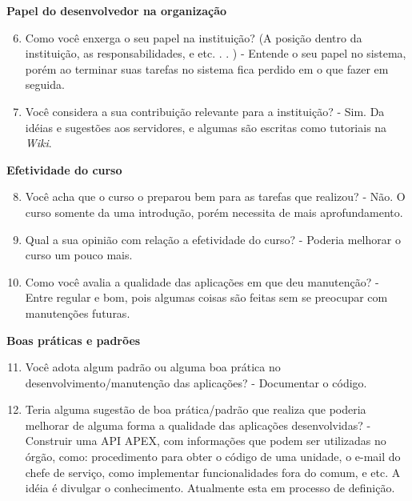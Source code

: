 \begin{apendicesenv}
\textbf{Papel do desenvolvedor na organização}

\begin{enumerate}
	\setcounter{enumi}{5}
	\item Como você enxerga o seu papel na instituição? (A posição dentro da instituição, as
	responsabilidades, e etc. . . )\newline
	- Entende o seu papel no sistema, porém ao terminar suas tarefas no sistema fica perdido em o que fazer em seguida.
	\item Você considera a sua contribuição relevante para a instituição?\newline
	- Sim. Da idéias e sugestões aos servidores, e algumas são escritas como tutoriais na \textit{Wiki}.
\end{enumerate}

\textbf{Efetividade do curso}

\begin{enumerate}
	\setcounter{enumi}{7}
	\item Você acha que o curso o preparou bem para as tarefas que realizou?\newline
	- Não. O curso somente da uma introdução, porém necessita de mais aprofundamento.
	\item Qual a sua opinião com relação a efetividade do curso?\newline
	- Poderia melhorar o curso um pouco mais.
	\item Como você avalia a qualidade das aplicações em que deu manutenção?\newline
	- Entre regular e bom, pois algumas coisas são feitas sem se preocupar com manutenções futuras.
\end{enumerate}

\textbf{Boas práticas e padrões}

\begin{enumerate}
	\setcounter{enumi}{10}
	\item Você adota algum padrão ou alguma boa prática no desenvolvimento/manutenção das
	aplicações?\newline
	- Documentar o código.
	\item Teria alguma sugestão de boa prática/padrão que realiza que poderia melhorar de
	alguma forma a qualidade das aplicações desenvolvidas?\newline
	- Construir uma API APEX, com informações que podem ser utilizadas no órgão, como: procedimento para obter o código de uma unidade, o e-mail do chefe de serviço, como implementar funcionalidades fora do comum, e etc. A idéia é divulgar o conhecimento. Atualmente esta em processo de definição.
\end{enumerate}


\end{apendicesenv}
